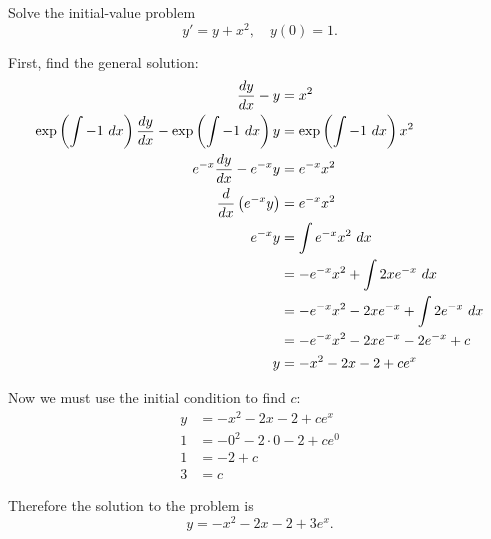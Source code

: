 \begin{example}
Solve the initial-value problem
\[y'=y+x^2,\quad y(0)=1.\]

First, find the general solution:
\begin{align*}
\frac{dy}{dx} - y &= x^2\\
\exp\left(\int -1 \ dx\right)\frac{dy}{dx} - \exp\left(\int -1 \ dx\right)y &= \exp\left(\int -1 \ dx\right)x^2\\
e^{-x}\frac{dy}{dx} - e^{-x}y &= e^{-x}x^2\\
\frac{d}{dx}\left(e^{-x}y\right) &= e^{-x}x^2\\
e^{-x}y &= \int e^{-x}x^2\ dx\\
&= -e^{-x}x^2 + \int2xe^{-x}\ dx\\
&= -e^{-x}x^2 - 2xe^{-x} + \int2e^{-x}\ dx\\
&= -e^{-x}x^2 - 2xe^{-x} -2e^{-x}+c\\
y &= -x^2 - 2x -2+ce^x
\end{align*}

Now we must use the initial condition to find \(c\):
\begin{align*}
y &= -x^2 - 2x -2+ce^x\\
1 &= -0^2 - 2\cdot0 -2+ce^0\\
1 &= -2+c\\
3 &= c
\end{align*}

Therefore the solution to the problem is \[y = -x^2 - 2x -2+3e^x.\]
\end{example}

